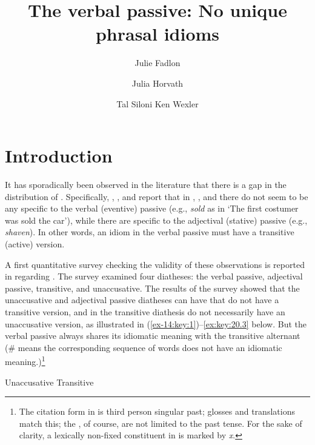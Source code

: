 \documentclass[output=paper]{langsci/langscibook}
\author{Julie Fadlon\affiliation{Tel Aviv University}\and
        Julia Horvath\affiliation{Tel Aviv University}\and
        Tal Siloni\affiliation{Tel Aviv University}\lastand
        Ken Wexler\affiliation{Massachusetts Institute of Technology}}
\title{The verbal passive: No unique phrasal idioms}
\begin{document}
\glsresetall

\section{Introduction}

It has sporadically been observed in the literature that there is a gap in the
distribution of . Specifically, \citet{DubSim1996}, \citet{Marantz1997},
and \textcite{Ruwet1991} report that in , , and
 there do not seem to be any  specific to
the verbal (eventive) passive (e.g., \emph{sold} as in ‘The first costumer was
sold the car’), while there are  specific to the adjectival (stative)
passive (e.g., \emph{shaven}). In other words, an idiom in the verbal passive
must have a transitive (active) version.

A first quantitative survey checking the validity of these observations is
reported in \citet{HorSil2009} regarding . The survey examined four
diatheses: the verbal passive, adjectival passive, transitive, and
unaccusative. The results of the survey showed that the unaccusative and
adjectival passive diatheses can have  that do not have a transitive
version, and  in the transitive diathesis do not necessarily have an
unaccusative version, as illustrated in (\ref{ex-14:key:1})--\eqref{ex:key:20.3} below. But the verbal passive
always shares its idiomatic meaning with the transitive alternant (\# means the
corresponding sequence of words does not have an idiomatic
meaning.)\footnote{The citation form in  is third person singular
    past; glosses and translations match this; the , of course, are not
    limited to the past tense. For the sake of clarity, a lexically non-fixed
    constituent in   is marked by \emph{x}.}

\ea\label{ex-14:key:1} 
    \ea Unaccusative
    \ex Transitive
    \z
\z
\end{document}
